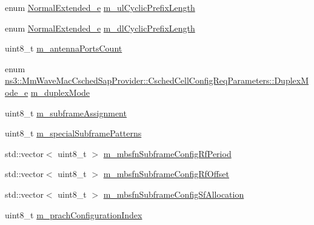 \begin{DoxyCompactItemize}
\item 
enum \hyperlink{namespacens3_acf4e55ff5777ad2ac5ce429a45c38506}{Normal\+Extended\+\_\+e} \hyperlink{structns3_1_1MmWaveMacCschedSapProvider_1_1CschedCellConfigReqParameters_a529c8fd04e9d0b31a827d49db745c4c6}{m\+\_\+ul\+Cyclic\+Prefix\+Length}
\item 
enum \hyperlink{namespacens3_acf4e55ff5777ad2ac5ce429a45c38506}{Normal\+Extended\+\_\+e} \hyperlink{structns3_1_1MmWaveMacCschedSapProvider_1_1CschedCellConfigReqParameters_a8bb08cfe75ac47cc7e89103c0234af67}{m\+\_\+dl\+Cyclic\+Prefix\+Length}
\item 
uint8\+\_\+t \hyperlink{structns3_1_1MmWaveMacCschedSapProvider_1_1CschedCellConfigReqParameters_a72b781cdcb9bbf30461a72970c5cb538}{m\+\_\+antenna\+Ports\+Count}
\item 
enum \hyperlink{structns3_1_1MmWaveMacCschedSapProvider_1_1CschedCellConfigReqParameters_a79e0de4f5001a9cdac7a5747ece3bb4d}{ns3\+::\+Mm\+Wave\+Mac\+Csched\+Sap\+Provider\+::\+Csched\+Cell\+Config\+Req\+Parameters\+::\+Duplex\+Mode\+\_\+e} \hyperlink{structns3_1_1MmWaveMacCschedSapProvider_1_1CschedCellConfigReqParameters_a699f15847364a2a733aa9454c7345b57}{m\+\_\+duplex\+Mode}
\item 
uint8\+\_\+t \hyperlink{structns3_1_1MmWaveMacCschedSapProvider_1_1CschedCellConfigReqParameters_a3ceabffe16fbae9218aa8a0fe3541af6}{m\+\_\+subframe\+Assignment}
\item 
uint8\+\_\+t \hyperlink{structns3_1_1MmWaveMacCschedSapProvider_1_1CschedCellConfigReqParameters_af1aeb9b8d85ad5e00116b8e26c607d5e}{m\+\_\+special\+Subframe\+Patterns}
\item 
std\+::vector$<$ uint8\+\_\+t $>$ \hyperlink{structns3_1_1MmWaveMacCschedSapProvider_1_1CschedCellConfigReqParameters_aea38dc37d56f720717d086c5ecb1b4fe}{m\+\_\+mbsfn\+Subframe\+Config\+Rf\+Period}
\item 
std\+::vector$<$ uint8\+\_\+t $>$ \hyperlink{structns3_1_1MmWaveMacCschedSapProvider_1_1CschedCellConfigReqParameters_a77008de4022caf2d28dde54b826ec147}{m\+\_\+mbsfn\+Subframe\+Config\+Rf\+Offset}
\item 
std\+::vector$<$ uint8\+\_\+t $>$ \hyperlink{structns3_1_1MmWaveMacCschedSapProvider_1_1CschedCellConfigReqParameters_a95cfdaadd4251955e723cdf7532944e6}{m\+\_\+mbsfn\+Subframe\+Config\+Sf\+Allocation}
\item 
uint8\+\_\+t \hyperlink{structns3_1_1MmWaveMacCschedSapProvider_1_1CschedCellConfigReqParameters_a89c22f29b94a1b769a5eac602bffa449}{m\+\_\+prach\+Configuration\+Index}
\item 

\end{DoxyCompactItemize}
